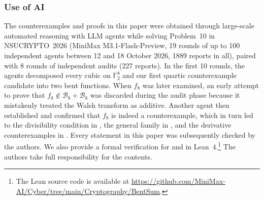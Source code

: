 \documentclass{amsart}
\numberwithin{equation}{section}
\theoremstyle{plain}
\theoremstyle{definition}
\theoremstyle{remark}
\newcommand{\F}{\mathbb{F}_2}
\newcommand{\B}{\mathcal{B}}
\begin{document}
\subsubsection*{Use of AI}
The counterexamples and proofs in this paper were obtained through large-scale automated reasoning with LLM agents while solving Problem~10 in NSUCRYPTO~2026 (MiniMax M3.1-Flash-Preview, 19 rounds of up to 100 independent agents between 12 and 18 October 2026, 1889 reports in all), paired with 8 rounds of independent audits (227 reports).
In the first 10 rounds, the agents decomposed every cubic on $\F^8$ and our first quartic counterexample candidate into two bent functions. When $f_8$ was later examined, an early attempt to prove that $f_8\notin\B_8+\B_8$ was discarded during the audit phase because it mistakenly treated the Walsh transform as additive. Another agent then established  and confirmed that $f_8$ is indeed a counterexample, which in turn led to the divisibility condition in , the general family in , and the derivative counterexamples in .
Every statement in this paper was subsequently checked by the authors. We also provide a formal verification for
 and 
in Lean~4.\footnote{The Lean source code is available at
\url{https://github.com/MiniMax-AI/Cyber/tree/main/Cryptography/BentSum}.}
The authors take full responsibility for the contents.


\end{document}
